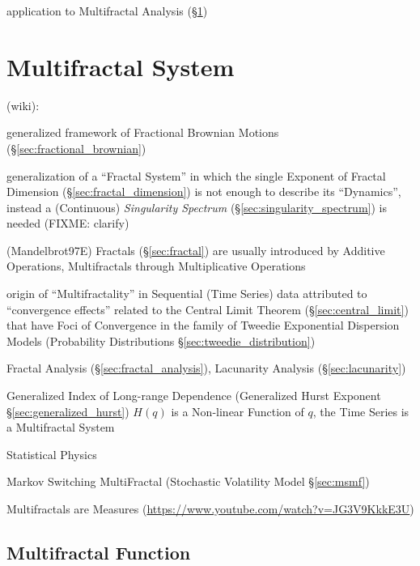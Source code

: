 application to Multifractal Analysis (\S\ref{sec:multifractal_system})



\section{Multifractal System}\label{sec:multifractal_system}

(wiki):

generalized framework of Fractional Brownian Motions
(\S\ref{sec:fractional_brownian})

generalization of a ``Fractal System'' in which the single Exponent of Fractal
Dimension (\S\ref{sec:fractal_dimension}) is not enough to describe its
``Dynamics'',  instead a (Continuous) \emph{Singularity Spectrum}
(\S\ref{sec:singularity_spectrum}) is needed (FIXME: clarify)

(Mandelbrot97E) Fractals (\S\ref{sec:fractal}) are usually introduced by
Additive Operations, Multifractals through Multiplicative Operations

origin of ``Multifractality'' in Sequential (Time Series) data attributed to
``convergence effects'' related to the Central Limit Theorem
(\S\ref{sec:central_limit}) that have Foci of Convergence in the family of
Tweedie Exponential Dispersion Models (Probability Distributions
\S\ref{sec:tweedie_distribution})

Fractal Analysis (\S\ref{sec:fractal_analysis}), Lacunarity Analysis
(\S\ref{sec:lacunarity})

Generalized Index of Long-range Dependence (Generalized Hurst Exponent
\S\ref{sec:generalized_hurst}) $H(q)$ is a Non-linear Function of $q$, the Time
Series is a Multifractal System

Statistical Physics

\fist Markov Switching MultiFractal (Stochastic Volatility Model
\S\ref{sec:msmf})

Multifractals are Measures (\url{https://www.youtube.com/watch?v=JG3V9KkkE3U})



\subsection{Multifractal Function}\label{sec:multifractal_function}

